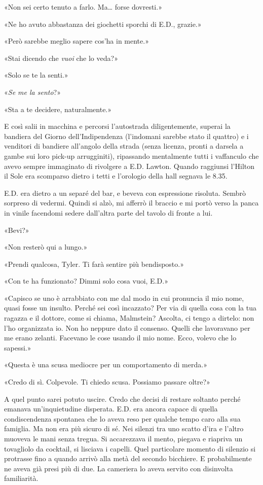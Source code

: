 «Non sei certo tenuto a farlo. Ma\ldots{} forse dovresti.»

«Ne ho avuto abbastanza dei giochetti sporchi di E.D., grazie.»

«Però sarebbe meglio sapere cos'ha in mente.»

«Stai dicendo che \emph{vuoi} che lo veda?»

«Solo se te la senti.»

«\emph{Se me la sento}?»

«Sta a te decidere, naturalmente.»

E così salii in macchina e percorsi l'autostrada diligentemente, superai
la bandiera del Giorno dell'Indipendenza (l'indomani sarebbe stato il
quattro) e i venditori di bandiere all'angolo della strada (senza
licenza, pronti a darsela a gambe sui loro pick-up arrugginiti),
ripassando mentalmente tutti i vaffanculo che avevo sempre immaginato di
rivolgere a E.D. Lawton. Quando raggiunsi l'Hilton il Sole era scomparso
dietro i tetti e l'orologio della hall segnava le 8.35.

E.D. era dietro a un separé del bar, e beveva con espressione risoluta.
Sembrò sorpreso di vedermi. Quindi si alzò, mi afferrò il braccio e mi
portò verso la panca in vinile facendomi sedere dall'altra parte del
tavolo di fronte a lui.

«Bevi?»

«Non resterò qui a lungo.»

«Prendi qualcosa, Tyler. Ti farà sentire più bendisposto.»

«Con te ha funzionato? Dimmi solo cosa vuoi, E.D.»

«Capisco se uno è arrabbiato con me dal modo in cui pronuncia il mio
nome, quasi fosse un insulto. Perché sei così incazzato? Per via di
quella cosa con la tua ragazza e il dottore, come si chiama, Malmstein?
Ascolta, ci tengo a dirtelo: non l'ho organizzata io. Non ho neppure
dato il consenso. Quelli che lavoravano per me erano zelanti. Facevano
le cose usando il mio nome. Ecco, volevo che lo sapessi.»

«Questa è una scusa mediocre per un comportamento di merda.»

«Credo di sì. Colpevole. Ti chiedo scusa. Possiamo passare oltre?»

A quel punto sarei potuto uscire. Credo che decisi di restare soltanto
perché emanava un'inquietudine disperata. E.D. era ancora capace di
quella condiscendenza spontanea che lo aveva reso per qualche tempo caro
alla sua famiglia. Ma non era più sicuro di sé. Nei silenzi tra uno
scatto d'ira e l'altro muoveva le mani senza tregua. Si accarezzava il
mento, piegava e riapriva un tovagliolo da cocktail, si lisciava i
capelli. Quel particolare momento di silenzio si protrasse fino a quando
arrivò alla metà del secondo bicchiere. E probabilmente ne aveva già
presi più di due. La cameriera lo aveva servito con disinvolta
familiarità.

